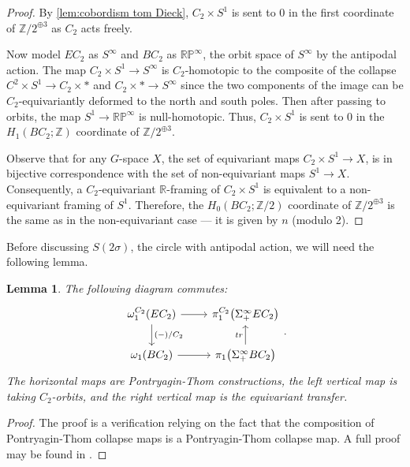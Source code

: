 \documentclass[11pt]{amsart}
\newcommand{\R}{\mathbb R}
\newcommand{\Z}{\mathbb{Z}}
\newcommand{\RP}{\mathbb{RP}}
\theoremstyle{plain}   %
\newtheorem{lem}[thm]{Lemma}
\theoremstyle{definition}
\theoremstyle{remark}
\numberwithin{equation}{section}
\let\originalleft\left
\let\originalright\right
\renewcommand{\left}{\mathopen{}\mathclose\bgroup\originalleft}
\renewcommand{\right}{\aftergroup\egroup\originalright}
\begin{document}
\begin{proof}
By \cref{lem:cobordism tom Dieck}, $C_2\times S^1$ is sent to 0 in the first coordinate of $\Z/2^{\oplus 3}$ as $C_2$ acts freely. 

Now model $EC_2$ as $S^\infty$ and $BC_2$ as $\RP^\infty$, the orbit space of $S^\infty$ by the antipodal action. The map $C_2\times S^1\to S^\infty$ is $C_2$-homotopic to the composite of the collapse $C^2 \times S^1 \to C_2 \times *$ and $C_2\times *\to S^\infty$ since the two components of the image can be $C_2$-equivariantly deformed to the north and south poles. Then after passing to orbits, the map $S^1\to \RP^\infty$ is null-homotopic. Thus, $C_2\times S^1$ is sent to 0 in the $H_1(BC_2;\Z)$ coordinate of $\Z/2^{\oplus 3}$. 

Observe that for any $G$-space $X$, the set of equivariant maps $C_2\times S^1\to X$, is in bijective correspondence with the set of non-equivariant maps $S^1\to X$. Consequently, a $C_2$-equivariant $\R$-framing of $C_2 \times S^1$ is equivalent to a non-equivariant framing of $S^1$. Therefore, the $H_0(BC_2;\Z/2)$ coordinate of $\Z/2^{\oplus 3}$ is the same as in the non-equivariant case --- it is given by $n$ (modulo 2).   
\end{proof}

Before discussing $S(2\sigma)$, the circle with antipodal action, we will need the following lemma. 

\begin{lem}\label{lem:orbits transfer}
The following diagram commutes:
\[
\begin{tikzcd}
\omega_1^{C_2}\left(EC_2\right) \arrow[d,"(-)/C_2"] \arrow[r] & \pi_1^{C_2}\left(\Sigma_+^\infty EC_2\right)\\
\omega_1\left(BC_2\right) \arrow[r] & \pi_1\left(\Sigma_+^\infty BC_2\right) \arrow[u,"tr"]
\end{tikzcd}.
\]
The horizontal maps are Pontryagin-Thom constructions, the left vertical map is taking $C_2$-orbits, and the right vertical map is the equivariant transfer. 
\end{lem}

\begin{proof}
The proof is a verification relying on the fact that the composition of Pontryagin-Thom collapse maps is a Pontryagin-Thom collapse map. A full proof may be found in \cite[Lemma 4.11]{periodic_points}. 
\end{proof}
\end{document}
